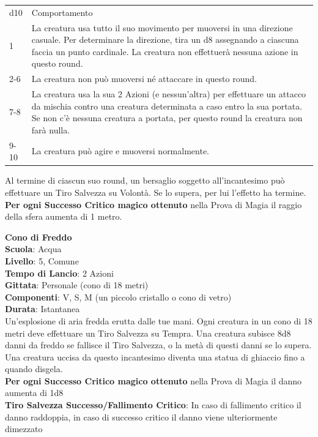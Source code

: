 \begin{multicols}{2}
\medskip

\begin{tabularx}{0.45\textwidth}{lX}
	\hline
	d10 & Comportamento\\
	1 & La creatura usa tutto il suo movimento per muoversi in una direzione casuale. Per determinare la direzione, tira un d8 assegnando a ciascuna faccia un punto cardinale. La
	creatura non effettuerà nessuna azione in questo round. \\
	2-6 & La creatura non può muoversi né attaccare in questo round.\\
	7-8 & La creatura usa la sua 2 Azioni (e nessun'altra) per effettuare un attacco da mischia contro una creatura determinata a caso entro la sua portata. Se non c'è nessuna creatura a portata, per questo round la creatura non farà nulla.\\
	9-10 & La creatura può agire e muoversi normalmente.\\
\end{tabularx}

\medskip

Al termine di ciascun suo round, un bersaglio soggetto all'incantesimo può effettuare un Tiro Salvezza su Volontà. Se lo supera, per lui l'effetto ha termine. \\
\textbf{Per ogni Successo Critico magico ottenuto} nella Prova di Magia il raggio della sfera aumenta di 1 metro.

\medskip\textbf{Cono di Freddo}\\
\textbf{Scuola}: Acqua\\
\textbf{Livello}: 5, Comune\\
\textbf{Tempo di Lancio}: 2 Azioni\\
\textbf{Gittata}: Personale (cono di 18 metri)\\
\textbf{Componenti}: V, S, M (un piccolo cristallo o cono di vetro)\\
\textbf{Durata}: Istantanea\\
Un'esplosione di aria fredda erutta dalle tue mani. Ogni creatura in un cono di 18 metri deve effettuare un Tiro Salvezza su Tempra. Una creatura subisce 8d8 danni da freddo se fallisce il Tiro Salvezza, o la metà di questi danni se lo supera. Una creatura uccisa da questo incantesimo diventa una statua di ghiaccio fino a quando disgela.\\
\textbf{Per ogni Successo Critico magico ottenuto} nella Prova di Magia il danno aumenta di 1d8\\
\textbf{Tiro Salvezza Successo/Fallimento Critico}: In caso di fallimento critico il danno raddoppia, in caso di successo critico il danno viene ulteriormente dimezzato


\end{multicols}
